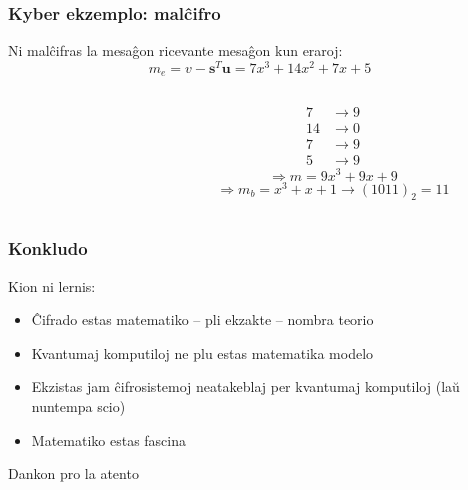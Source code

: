 \documentclass[utf8, aspectratio=169]{beamer}
\begin{document}
\begin{frame}
  \frametitle{Kyber ekzemplo: malĉifro}
  Ni malĉifras la mesaĝon ricevante mesaĝon kun eraroj:
  \[m_e = v - \mathbf{s}^T\mathbf{u} = 7x^3 + 14x^2 + 7x + 5\]

  \pause
  \begin{columns}
    \begin{column}{0.4\textwidth}
    \end{column}

    \begin{column}{0.6\textwidth}
      \[
        \begin{split}
          7 & \longrightarrow 9 \\
          14 & \longrightarrow 0 \\
          7 & \longrightarrow 9 \\
          5 & \longrightarrow 9
        \end{split}
      \]
      \pause
      \[\Longrightarrow m = 9x^3 + 9x + 9\]
      \pause
      \[\Longrightarrow m_b = x^3 + x + 1 \longrightarrow (1011)_2 = 11\]
    \end{column}
  \end{columns}
\end{frame}

\begin{frame}
  \frametitle{Konkludo}
  Kion ni lernis:
  \begin{itemize}
  \item Ĉifrado estas matematiko – pli ekzakte – nombra teorio
  \item Kvantumaj komputiloj ne plu estas matematika modelo
  \item Ekzistas jam ĉifrosistemoj neatakeblaj per kvantumaj komputiloj (laŭ
    nuntempa scio)
  \item Matematiko estas fascina
  \end{itemize}
\end{frame}

\begin{frame}
  \centering Dankon pro la atento
\end{frame}
\end{document}
